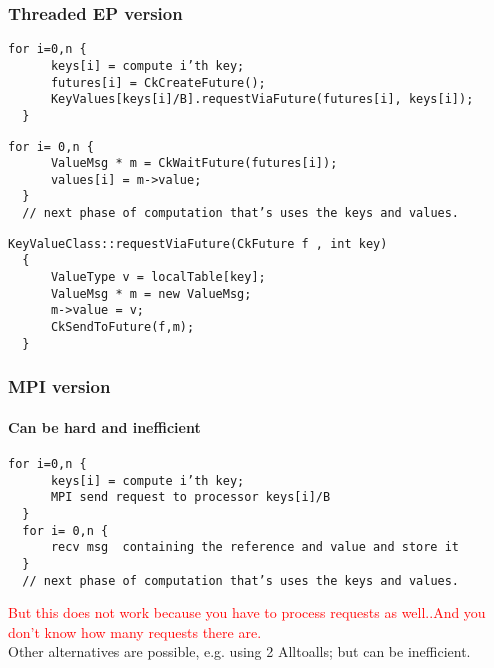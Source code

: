 \begin{frame}[fragile]

  \frametitle{Threaded EP version}

  \begin{lstlisting}[basicstyle=\footnotesize]
  for i=0,n {
      keys[i] = compute i’th key;
      futures[i] = CkCreateFuture();
      KeyValues[keys[i]/B].requestViaFuture(futures[i], keys[i]); 
  }
  \end{lstlisting}
  \pause
  \begin{lstlisting}[basicstyle=\footnotesize]
  for i= 0,n {
      ValueMsg * m = CkWaitFuture(futures[i]);
      values[i] = m->value;
  }
  // next phase of computation that’s uses the keys and values.
  \end{lstlisting}
  \pause
  \begin{lstlisting}[basicstyle=\footnotesize]
  KeyValueClass::requestViaFuture(CkFuture f , int key)
  {  
      ValueType v = localTable[key];
      ValueMsg * m = new ValueMsg;
      m->value = v;
      CkSendToFuture(f,m);
  }
  \end{lstlisting}
\end{frame}

\begin{frame}[fragile]

  \frametitle{MPI version}
  \framesubtitle{Can be hard and inefficient}

  \begin{lstlisting}[basicstyle=\footnotesize]
  for i=0,n {
      keys[i] = compute i’th key; 
      MPI send request to processor keys[i]/B
  }
  for i= 0,n {
      recv msg  containing the reference and value and store it
  }
  // next phase of computation that’s uses the keys and values.
  \end{lstlisting}
  \pause
  \textcolor{red}{But this does not work because you have to process 
  requests as well..And you don’t know how many requests there are.}
  \pause
  \\
  \vspace{.2cm}
  Other alternatives are possible, e.g. using 2 Alltoalls; but can be inefficient.
\end{frame}


